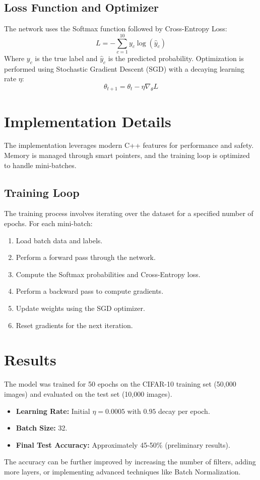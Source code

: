 \documentclass[11pt, a4paper]{article}
\begin{document}
\subsection{Loss Function and Optimizer}
The network uses the Softmax function followed by Cross-Entropy Loss:
\begin{equation}
    L = -\sum_{c=1}^{10} y_c \log(\hat{y}_c)
\end{equation}
Where $y_c$ is the true label and $\hat{y}_c$ is the predicted probability. Optimization is performed using Stochastic Gradient Descent (SGD) with a decaying learning rate $\eta$:
\begin{equation}
    \theta_{t+1} = \theta_t - \eta \nabla_\theta L
\end{equation}

\section{Implementation Details}
The implementation leverages modern C++ features for performance and safety. Memory is managed through smart pointers, and the training loop is optimized to handle mini-batches.

\subsection{Training Loop}
The training process involves iterating over the dataset for a specified number of epochs. For each mini-batch:
\begin{enumerate}
    \item Load batch data and labels.
    \item Perform a forward pass through the network.
    \item Compute the Softmax probabilities and Cross-Entropy loss.
    \item Perform a backward pass to compute gradients.
    \item Update weights using the SGD optimizer.
    \item Reset gradients for the next iteration.
\end{enumerate}

\section{Results}
The model was trained for 50 epochs on the CIFAR-10 training set (50,000 images) and evaluated on the test set (10,000 images). 

\begin{itemize}
    \item \textbf{Learning Rate:} Initial $\eta = 0.0005$ with $0.95$ decay per epoch.
    \item \textbf{Batch Size:} 32.
    \item \textbf{Final Test Accuracy:} Approximately 45-50\% (preliminary results).
\end{itemize}
The accuracy can be further improved by increasing the number of filters, adding more layers, or implementing advanced techniques like Batch Normalization.
\end{document}

